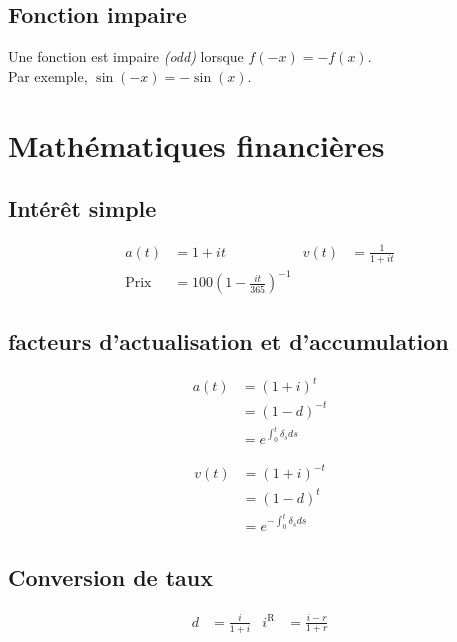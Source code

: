 \documentclass[10pt, french]{article}
\begin{document}
\begin{multicols*}{2}
\subsection*{Fonction impaire}

Une fonction est impaire \textit{(odd)} lorsque $f(-x) = -f(x)$.\\
Par exemple, $\sin(-x) = -\sin(x)$.

\newpage

\section{Mathématiques financières}

\subsection*{Intérêt simple}
\begin{align*}
	a(t)
		&=	1 + it &
	v(t)
		&=	\frac{1}{1 + it} \\
	\text{Prix}
		&=	100 \left( 1 - \frac{it}{365} \right)^{-1}
\end{align*}

\subsection*{facteurs d'actualisation et d'accumulation}
\begin{minipage}[t]{.5\linewidth}
\begin{align*}
	a(t) 
		&= 	(1 + i)^{t} 		\\
		&= 	(1 - d)^{-t}	\\
		&= 	e^{\int_{0}^{t} \delta_s ds} 
\end{align*}
\end{minipage}
\begin{minipage}[t]{.5\linewidth}
	\begin{align*}
	v(t) 
		&=	(1 + i)^{-t}		\\
		&=	(1 - d)^{t}	 	\\
		&= 	e^{-\int_{0}^{t} \delta_s ds} 
\end{align*}
\end{minipage}

\subsection*{Conversion de taux}
\begin{align*}
	d	&= 	\frac{i}{1 + i} &
	i^{\mathrm{R}}
		&=	\frac{i - r}{1 + r}
\end{align*}


\end{multicols*}
\end{document}
